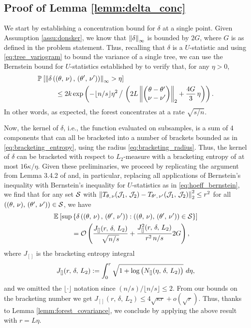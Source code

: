 \documentclass[aos]{imsart}
\theoremstyle{plain}
\theoremstyle{definition}
\theoremstyle{remark}
\begin{document}
\begin{CJK}{UTF8}{gbsn}
\begin{appendix}
\subsection*{Proof of Lemma \ref{lemm:delta_conc}}

We start by establishing a concentration bound for
$\delta$ at a single point. Given Assumption \ref{assu:donsker}, we
know that $\left\lVert\delta\right\rVert_\infty$ is bounded by $2G$, where $G$ is as defined in the problem statement. Thus,
recalling that $\delta$ is a $U$-statistic and using \eqref{eq:tree_variogram}
to bound the variance of a single tree, we can use the Bernstein bound for $U$-statistics
established by \citet{hoeffding1963probability} to verify that, for any $\eta > 0$,
\begin{equation}
\label{eq:hoeff_bernstein}
\begin{split}
&\PP{\Norm{\delta\p{\p{\theta, \, \nu}, \, \p{\theta', \, \nu'}}}_\infty > \eta} \\
& \ \ \ \ \ \ \ \ 
\leq 2k \exp\p{-\lfloor n/s \rfloor \eta^2 \, \big/ \, \p{2 L \Norm{\begin{pmatrix} \theta -\theta' \\ \nu - \nu' \end{pmatrix}}_2 + \frac{4G}{3}\, \eta}}.
\end{split}
\end{equation}
In other words, as expected, the forest concentrates at a rate $\sqrt{s/n}$.

Now, the kernel of $\delta$, i.e., the function evaluated on
subsamples, is a sum of 4 components that can all be bracketed into a number of brackets bounded
as in \eqref{eq:bracketing_entropy}, using the radius \eqref{eq:bracketing_radius}. Thus, the kernel of $\delta$ can
be bracketed with respect to $L_2$-measure with a bracketing entropy of at most $16\kappa/\eta$.
Given these preliminaries, we proceed by replicating the argument
from Lemma 3.4.2 of \citet{van1996weak} and, in particular, replacing all applications of Bernstein's
inequality with Bernstein's inequality for $U$-statistics as in \eqref{eq:hoeff_bernstein},
we find that for any set $\mathcal{S}$ with
$\left\lVert T_{\theta, \, \nu}(\mathcal{J}_1, \, \mathcal{J}_2) - T_{\theta', \, \nu'}(\mathcal{J}_1, \, \mathcal{J}_2)\right\rVert_2^2 \leq r^2$
for all $((\theta, \, \nu), \, (\theta', \, \nu')) \in \mathcal{S}$, we have
\begin{align*}
&\EE{\sup\cb{\delta\p{\p{\theta, \, \nu}, \, \p{\theta', \, \nu'}} : ((\theta, \, \nu), \, (\theta', \, \nu')) \in \set}} \\
&\ \ \ \ \ \ \ \ = \oo\p{\frac{J_{[]}(r, \, \delta, \, L_2)}{\sqrt{ n/s }} + \frac{J^2_{[]}(r, \, \delta, \, L_2)}{r^2 \,  n/s } 2G},
\end{align*}
where $J_{[]}$ is the bracketing entropy integral
$$ J_{[]}(r, \, \delta, \, L_2) := \int_0^r \sqrt{1 + \log \left(N_{[]}(\eta, \, \delta, \, L_2)\right)} \ d\eta, $$
and we omitted the $\lfloor \cdot \rfloor$ notation since $(n/s) / \lfloor n/s \rfloor \leq 2$.
From our bounds on the bracketing number we get $J_{[]}(r, \, \delta, \, L_2) \leq 4\sqrt{\kappa r} + o(\sqrt{r})$.
Thus, thanks to Lemma \ref{lemm:forest_covariance}, we conclude by applying the above result with
$r = L \eta$.


\end{appendix}
\end{CJK}
\end{document}
